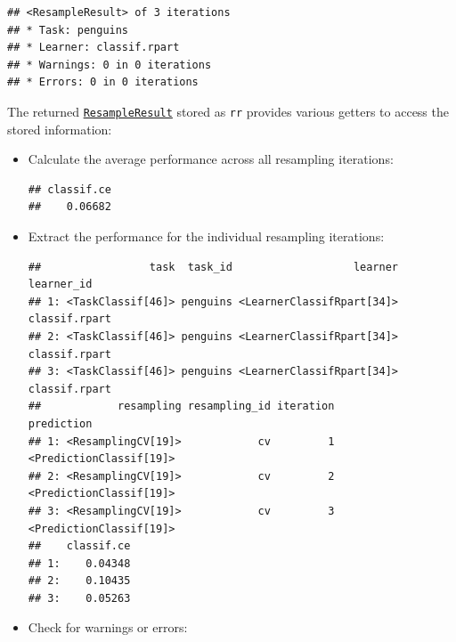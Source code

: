 \documentclass[
]{scrbook}
\newenvironment{Shaded}{\begin{snugshade}}{\end{snugshade}}
\newcommand{\FunctionTok}[1]{\textcolor[rgb]{0.00,0.00,0.00}{#1}}
\newcommand{\NormalTok}[1]{#1}
\newcommand{\SpecialCharTok}[1]{\textcolor[rgb]{0.00,0.00,0.00}{#1}}
\newcommand{\StringTok}[1]{\textcolor[rgb]{0.31,0.60,0.02}{#1}}
\renewenvironment{Shaded} {\begin{snugshade}\small} {\end{snugshade}}
\begin{document}
\begin{verbatim}
## <ResampleResult> of 3 iterations
## * Task: penguins
## * Learner: classif.rpart
## * Warnings: 0 in 0 iterations
## * Errors: 0 in 0 iterations
\end{verbatim}

The returned \href{https://mlr3.mlr-org.com/reference/ResampleResult.html}{\texttt{ResampleResult}} stored as \texttt{rr} provides various getters to access the stored information:

\begin{itemize}
\item
  Calculate the average performance across all resampling iterations:

\begin{Shaded}
\end{Shaded}

\begin{verbatim}
## classif.ce 
##    0.06682
\end{verbatim}
\item
  Extract the performance for the individual resampling iterations:

\begin{Shaded}
\end{Shaded}

\begin{verbatim}
##                 task  task_id                   learner    learner_id
## 1: <TaskClassif[46]> penguins <LearnerClassifRpart[34]> classif.rpart
## 2: <TaskClassif[46]> penguins <LearnerClassifRpart[34]> classif.rpart
## 3: <TaskClassif[46]> penguins <LearnerClassifRpart[34]> classif.rpart
##            resampling resampling_id iteration              prediction
## 1: <ResamplingCV[19]>            cv         1 <PredictionClassif[19]>
## 2: <ResamplingCV[19]>            cv         2 <PredictionClassif[19]>
## 3: <ResamplingCV[19]>            cv         3 <PredictionClassif[19]>
##    classif.ce
## 1:    0.04348
## 2:    0.10435
## 3:    0.05263
\end{verbatim}
\item
  Check for warnings or errors:


\end{itemize}
\end{document}

